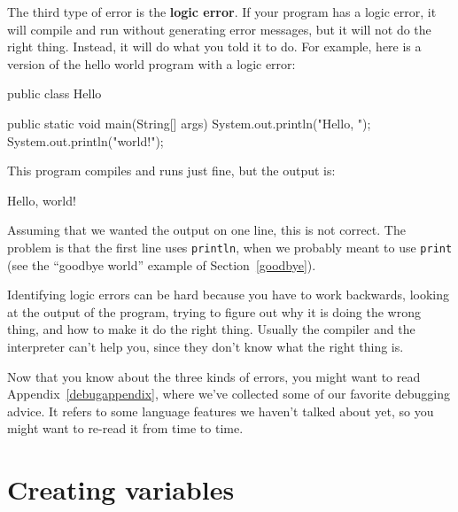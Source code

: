 \documentclass[12pt]{book}
\theoremstyle{exercise}
\newcommand{\java}[1]{\verb"#1"}
\begin{document}


The third type of error is the {\bf logic error}.
If your program has a logic error, it will compile and run without generating error messages, but it will not do the right thing.
Instead, it will do what you told it to do.
For example, here is a version of the hello world program with a logic error:

\begin{code}
public class Hello {

    public static void main(String[] args) {
        System.out.println("Hello, ");
        System.out.println("world!");
    }
}
\end{code}

This program compiles and runs just fine, but the output is:

\begin{stdout}
Hello,
world!
\end{stdout}

Assuming that we wanted the output on one line, this is not correct.
The problem is that the first line uses \java{println}, when we probably meant to use \java{print} (see the ``goodbye world'' example of Section~\ref{goodbye}).

Identifying logic errors can be hard because you have to work backwards, looking at the output of the program, trying to figure out why it is doing the wrong thing, and how to make it do the right thing.
Usually the compiler and the interpreter can't help you, since they don't know what the right thing is.

Now that you know about the three kinds of errors, you might want to read Appendix~\ref{debugappendix}, where we've collected some of our favorite debugging advice.
It refers to some language features we haven't talked about yet, so you might want to re-read it from time to time.


\section{Creating variables}


\end{document}

